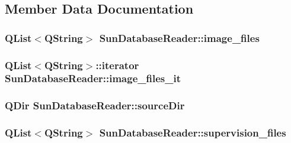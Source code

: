 \subsection{Member Data Documentation}
\hypertarget{class_sun_database_reader_a155716f43a3dc33e1a4d0a2a4a9f3ff1}{
\subsubsection[{image\+\_\+files}]{\setlength{\rightskip}{0pt plus 5cm}Q\+List$<$Q\+String$>$ Sun\+Database\+Reader\+::image\+\_\+files\hspace{0.3cm}{\ttfamily [private]}}}\label{class_sun_database_reader_a155716f43a3dc33e1a4d0a2a4a9f3ff1}
\hypertarget{class_sun_database_reader_a227d88c9c5c3d37b0f27123027c0b00e}{
\subsubsection[{image\+\_\+files\+\_\+it}]{\setlength{\rightskip}{0pt plus 5cm}Q\+List$<$Q\+String$>$\+::iterator Sun\+Database\+Reader\+::image\+\_\+files\+\_\+it\hspace{0.3cm}{\ttfamily [private]}}}\label{class_sun_database_reader_a227d88c9c5c3d37b0f27123027c0b00e}
\hypertarget{class_sun_database_reader_a6bfc31b2ba24be2b3e18c32e0d343d70}{
\subsubsection[{source\+Dir}]{\setlength{\rightskip}{0pt plus 5cm}Q\+Dir Sun\+Database\+Reader\+::source\+Dir\hspace{0.3cm}{\ttfamily [private]}}}\label{class_sun_database_reader_a6bfc31b2ba24be2b3e18c32e0d343d70}
\hypertarget{class_sun_database_reader_ac5afd4950a668e5cff2bc5c6ea024b60}{
\subsubsection[{supervision\+\_\+files}]{\setlength{\rightskip}{0pt plus 5cm}Q\+List$<$Q\+String$>$ Sun\+Database\+Reader\+::supervision\+\_\+files\hspace{0.3cm}{\ttfamily [private]}}}\label{class_sun_database_reader_ac5afd4950a668e5cff2bc5c6ea024b60}
